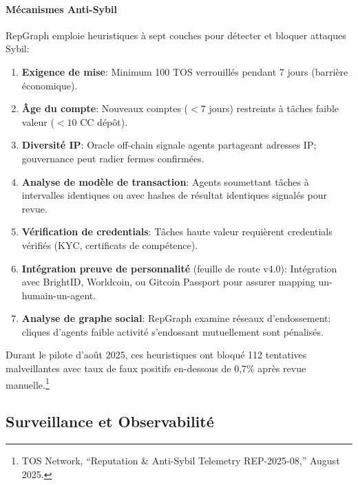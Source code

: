 \documentclass[11pt]{article}
\begin{document}
\paragraph{Mécanismes Anti-Sybil} RepGraph emploie heuristiques à sept couches pour détecter et bloquer attaques Sybil:
\begin{enumerate}[noitemsep]
  \item \textbf{Exigence de mise}: Minimum 100 TOS verrouillés pendant 7 jours (barrière économique).
  \item \textbf{Âge du compte}: Nouveaux comptes ($<7$ jours) restreints à tâches faible valeur ($<10$ CC dépôt).
  \item \textbf{Diversité IP}: Oracle off-chain signale agents partageant adresses IP; gouvernance peut radier fermes confirmées.
  \item \textbf{Analyse de modèle de transaction}: Agents soumettant tâches à intervalles identiques ou avec hashes de résultat identiques signalés pour revue.
  \item \textbf{Vérification de credentials}: Tâches haute valeur requièrent credentials vérifiés (KYC, certificats de compétence).
  \item \textbf{Intégration preuve de personnalité} (feuille de route v4.0): Intégration avec BrightID, Worldcoin, ou Gitcoin Passport pour assurer mapping un-humain-un-agent.
  \item \textbf{Analyse de graphe social}: RepGraph examine réseaux d'endossement; cliques d'agents faible activité s'endossant mutuellement sont pénalisés.
\end{enumerate}
Durant le pilote d'août 2025, ces heuristiques ont bloqué 112 tentatives malveillantes avec taux de faux positifs en-dessous de 0,7\% après revue manuelle.\footnote{TOS Network, ``Reputation \& Anti-Sybil Telemetry REP-2025-08,'' August 2025.}

\subsection{Surveillance et Observabilité}
\end{document}

